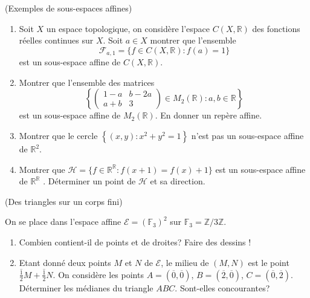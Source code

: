 \documentclass[a4paper,12pt,reqno]{amsart}
\begin{document}
\begin{exo} (Exemples de sous-espaces affines)
  \begin{enumerate}

  \item Soit $X$ un espace topologique, on considère l'espace $C(X,\mathbb{R})$ des fonctions réelles continues sur $X$. Soit $a \in X$ montrer que l'ensemble
    \[
      \mathcal{F}_{a,1}=\{ f \in C(X,\mathbb{R}) : f(a)=1 \}
    \]
  est un sous-espace affine de $C(X,\mathbb{R})$.

  \item Montrer que l'ensemble des matrices
    \[
      \left\{
        \left(
          \begin{array}{cc}
            1-a & b-2a\\
            a+b & 3
          \end{array}
        \right) \in M_{2}(\mathbb{R})
        : a,b \in \mathbb{R}
      \right\}
    \]
  est un sous-espace affine de $M_{2}(\mathbb{R})$. En donner un repère affine.

  \item Montrer que le cercle $\left\{ (x,y) : x^{2}+y^{2} = 1 \right\} $ n'est
  pas un sous-espace affine de $\mathbb{R}^{2}$.

  \item Montrer que $\mathcal{H} = \{ f \in \mathbb{R}^{\mathbb{R}} : f(x+1)=f(x)+1\}$
  est un sous-espace affine de $\mathbb{R}^{\mathbb{R}}$ . Déterminer
  un point de $\mathcal{H}$ et sa direction.
  \end{enumerate}
\end{exo}


\begin{exo} \hard (Des triangles sur un corps fini)

  On se place dans l'espace affine $\mathcal{E}=(\mathbb{F}_{3})^{2}$ sur $\mathbb{F}_{3}=\mathbb{Z}/3\mathbb{Z}$.

  \begin{enumerate}
    \item Combien contient-il de points et de droites? Faire des dessins !

    \item Etant donné deux points $M$ et $N$ de $\mathcal{E}$, le milieu de $(M,N)$ est le point $\overline{\frac{1}{2}}M+\overline{\frac{1}{2}}N$. On considère les points $A=(\overline{0}, \overline{0})$, $B=(\overline{2}, \overline{0})$, $C=(\overline{0}, \overline{2})$. Déterminer les médianes du triangle $ABC$. Sont-elles concourantes?
  \end{enumerate}
\end{exo}
\end{document}
